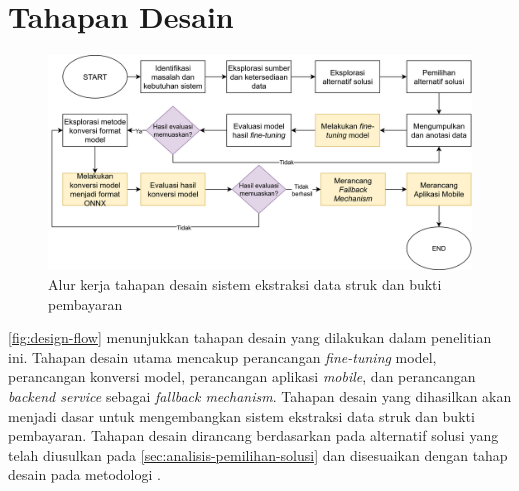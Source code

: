 \section{Tahapan Desain}
\label{sec:tahapan-desain}
\begin{figure}[htbp]
    \centering
    \includegraphics[width=\textwidth]{images/design-flow.png}
    \caption{Alur kerja tahapan desain sistem ekstraksi data struk dan bukti pembayaran}
    \label{fig:design-flow}
\end{figure}

\autoref{fig:design-flow} menunjukkan tahapan desain yang dilakukan dalam penelitian ini. Tahapan desain utama mencakup perancangan \emph{fine-tuning} model, perancangan konversi model, perancangan aplikasi \emph{mobile}, dan perancangan \emph{backend service} sebagai \emph{fallback mechanism}. Tahapan desain yang dihasilkan akan menjadi dasar untuk mengembangkan sistem ekstraksi data struk dan bukti pembayaran. Tahapan desain dirancang berdasarkan pada alternatif solusi yang telah diusulkan pada \autoref{sec:analisis-pemilihan-solusi} dan disesuaikan dengan tahap desain pada metodologi \dsrm.





   



